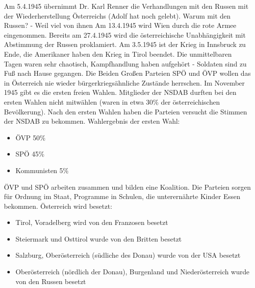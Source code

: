 \documentclass[a4paper,final]{report}
\begin{document}
Am 5.4.1945 übernimmt Dr. Karl Renner die Verhandlungen mit den Russen mit der Wiederherstellung Österreichs (Adolf hat noch gelebt). Warum mit den Russen? - Weil viel von ihnen 
\newline
Am 13.4.1945 wird Wien durch die rote Armee eingenommen. Bereits am 27.4.1945 wird die österreichische Unabhängigkeit mit Abstimmung der Russen proklamiert.
\newline
\newline
Am 3.5.1945 ist der Krieg in Innsbruck zu Ende, die Amerikaner haben den Krieg in Tirol beendet. Die unmittelbaren Tagen waren sehr chaotisch, Kampfhandlung haben aufgehört - Soldaten sind zu Fuß nach Hause gegangen.
\newline
\newline
Die Beiden Großen Parteien SPÖ und ÖVP wollen das in Österreich nie wieder bürgerkriegsähnliche Zustände herrschen.
\newline
\newline
Im November 1945 gibt es die ersten freien Wahlen. Mitglieder der NSDAB durften bei den ersten Wahlen nicht mitwählen (waren in etwa 30\% der österreichischen Bevölkerung). Nach den ersten Wahlen haben die Parteien versucht die Stimmen der NSDAB zu bekommen.
\newline
\newline
Wahlergebnis der ersten Wahl:

\begin{itemize}
\item ÖVP 50\%
\item SPÖ 45\%
\item Kommunisten 5\%
\end{itemize}

ÖVP und SPÖ arbeiten zusammen und bilden eine Koalition. Die Parteien sorgen für Ordnung im Staat, Programme in Schulen, die unterernährte Kinder Essen bekommen.
\newline
\newline
Österreich wird besetzt:

\begin{itemize}
\item Tirol, Voradelberg wird von den Franzosen besetzt
\item Steiermark und Osttirol wurde von den Britten besetzt
\item Salzburg, Oberösterreich (südliche des Donau) wurde von der USA besetzt
\item Oberösterreich (nördlich der Donau), Burgenland und Niederösterreich wurde von den Russen besetzt
\end{itemize}
\end{document}
